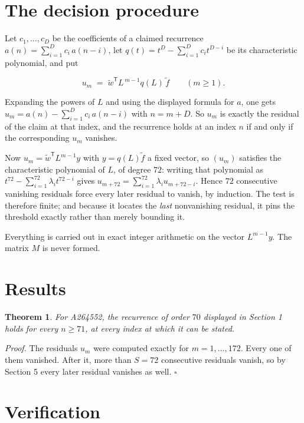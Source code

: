 \documentclass[11pt]{article}
\newtheorem{theorem}{Theorem}
\theoremstyle{definition}
\begin{document}
\section{The decision procedure}

Let $c_1,\dots,c_D$ be the coefficients of a claimed recurrence $a(n) = \sum_{i=1}^{D} c_i\,a(n-i)$, let $q(t) = t^{D} - \sum_{i=1}^{D} c_i t^{D-i}$ be its characteristic polynomial, and put

\[u_m \;=\; \tilde w^{\mathsf T} L^{\,m-1} q(L)\,\tilde f \qquad (m \ge 1).\]

Expanding the powers of $L$ and using the displayed formula for $a$, one gets $u_m = a(n) - \sum_{i=1}^{D} c_i\,a(n-i)$ with $n = m + D$. So $u_m$ is exactly the residual of the claim at that index, and the recurrence holds at an index $n$ if and only if the corresponding $u_m$ vanishes.

Now $u_m = \tilde w^{\mathsf T} L^{m-1} y$ with $y = q(L)\tilde f$ a fixed vector, so $(u_m)$ satisfies the characteristic polynomial of $L$, of degree $72$: writing that polynomial as $t^{72} - \sum_{i=1}^{72} \lambda_i t^{72-i}$ gives $u_{m+72} = \sum_{i=1}^{72} \lambda_i u_{m+72-i}$. Hence $72$ consecutive vanishing residuals force every later residual to vanish, by induction. The test is therefore finite; and because it locates the {\itshape last} nonvanishing residual, it pins the threshold exactly rather than merely bounding it.

Everything is carried out in exact integer arithmetic on the vector $L^{m-1}y$. The matrix $M$ is never formed.

\section{Results}

\begin{theorem} For A264552, the recurrence of order $70$ displayed in Section 1 holds for every $n \ge 71$, at every index at which it can be stated.\end{theorem}

{\itshape Proof.} The residuals $u_m$ were computed exactly for $m = 1,\dots,172$. Every one of them vanished. After it, more than $S = 72$ consecutive residuals vanish, so by Section 5 every later residual vanishes as well. $\square$

\section{Verification}
\end{document}
